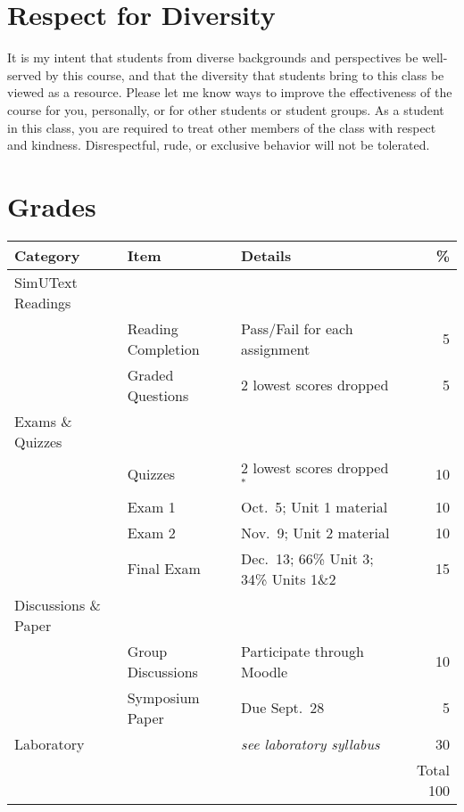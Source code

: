 \documentclass{tufte-handout}
\begin{document}
\begin{fullwidth}
\section{Respect for Diversity}

It is my intent that students from diverse backgrounds and perspectives be well-served by this course, and that the diversity that students bring to this class be viewed as a resource. Please let me know ways to improve the effectiveness of the course for you, personally, or for other students or student groups. As a student in this class, you are required to treat other members of the class with respect and kindness. Disrespectful, rude, or exclusive behavior will not be tolerated.

\section{Grades}


\begin{table}
\begin{tabular}{l l l r}
Category & Item & Details & \% \\
\hline
SimUText Readings & \\
& Reading Completion & Pass/Fail for each assignment & 5 \\
& Graded Questions & 2 lowest scores dropped & 5 \\
\hline
Exams \& Quizzes \\
& Quizzes & 2 lowest scores dropped$^*$ & 10 \\
& Exam 1 & Oct.~5; Unit 1 material & 10 \\
& Exam 2 & Nov.~9; Unit 2 material & 10 \\
& Final Exam & Dec.~13; 66\% Unit 3; 34\% Units 1\&2 & 15 \\ 							%
\hline 
Discussions \& Paper \\
& Group Discussions & Participate through Moodle & 10 \\
 & Symposium Paper & Due Sept.~28 & 5 \\
\hline
Laboratory & & \emph{see laboratory syllabus} & 30 \\
\hline
& & & Total 100
\end{tabular}
\end{table}

\end{fullwidth}
\end{document}
